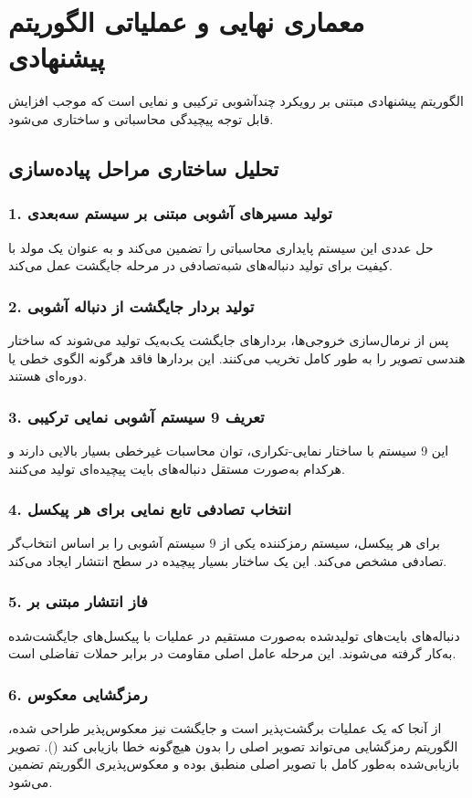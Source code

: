 \section{معماری نهایی و عملیاتی الگوریتم پیشنهادی}
الگوریتم پیشنهادی مبتنی بر رویکرد چندآشوبی ترکیبی و نمایی است که موجب افزایش قابل توجه پیچیدگی محاسباتی و ساختاری می‌شود.

\subsection{تحلیل ساختاری مراحل پیاده‌سازی}

\subsubsection{1. تولید مسیرهای آشوبی مبتنی بر سیستم سه‌بعدی }
حل عددی این سیستم پایداری محاسباتی را تضمین می‌کند و به عنوان یک مولد با کیفیت برای تولید دنباله‌های شبه‌تصادفی در مرحله جایگشت عمل می‌کند.

\subsubsection{2. تولید بردار جایگشت از دنباله آشوبی}
پس از نرمال‌سازی خروجی‌ها، بردارهای جایگشت یک‌به‌یک تولید می‌شوند که ساختار هندسی تصویر را به طور کامل تخریب می‌کنند. این بردارها فاقد هرگونه الگوی خطی یا دوره‌ای هستند.

\subsubsection{3. تعریف 9 سیستم آشوبی نمایی ترکیبی}
این 9 سیستم با ساختار نمایی-تکراری، توان محاسبات غیرخطی بسیار بالایی دارند و هرکدام به‌صورت مستقل دنباله‌های بایت پیچیده‌ای تولید می‌کنند.

\subsubsection{4. انتخاب تصادفی تابع نمایی برای هر پیکسل}
برای هر پیکسل، سیستم رمزکننده یکی از 9 سیستم آشوبی را بر اساس انتخاب‌گر تصادفی مشخص می‌کند. این یک ساختار بسیار پیچیده در سطح انتشار ایجاد می‌کند.

\subsubsection{5. فاز انتشار مبتنی بر }
دنباله‌های بایت‌های تولیدشده به‌صورت مستقیم در عملیات  با پیکسل‌های جایگشت‌شده به‌کار گرفته می‌شوند. این مرحله عامل اصلی مقاومت در برابر حملات تفاضلی است.

\subsubsection{6. رمزگشایی معکوس}
از آنجا که  یک عملیات برگشت‌پذیر است و جایگشت نیز معکوس‌پذیر طراحی شده، الگوریتم رمزگشایی می‌تواند تصویر اصلی را بدون هیچ‌گونه خطا بازیابی کند (). تصویر بازیابی‌شده به‌طور کامل با تصویر اصلی منطبق بوده و معکوس‌پذیری الگوریتم تضمین می‌شود.
